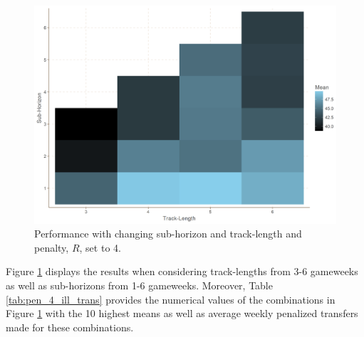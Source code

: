 


\begin{figure}[H]
    \centering
    \includegraphics[scale=0.5]{fig/chapter_6/pen_4.png}
    \caption{Performance with changing sub-horizon and track-length and penalty, $R$, set to 4.}
\label{fig:pen_4}    
\end{figure}

Figure \ref{fig:pen_4} displays the results when considering track-lengths from 3-6 gameweeks as well as sub-horizons from 1-6 gameweeks.  Moreover, Table \ref{tab:pen_4_ill_trans} provides the numerical values of the combinations in Figure \ref{fig:pen_4} with the 10 highest means as well as average weekly penalized transfers made for these combinations.  



